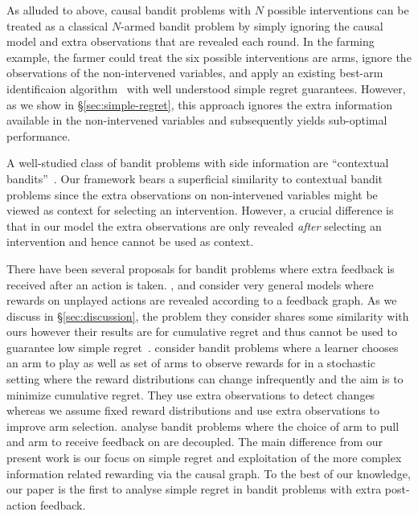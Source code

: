 As alluded to above, causal bandit problems with $N$ possible interventions can be treated as a classical $N$-armed bandit problem by simply ignoring the causal model and extra observations that are revealed each round.
In the farming example, the farmer could treat the six possible interventions are arms, ignore the observations of the non-intervened variables, and apply an existing best-arm identificaion algorithm~\citep{Jamieson2013} with well understood simple regret guarantees.
However, as we show in \S\ref{sec:simple-regret}, this approach ignores the extra information available in the non-intervened variables and subsequently yields sub-optimal performance.

A well-studied class of bandit problems with side information are ``contextual bandits''~\cite{Langford2008,Agarwal2014}.
Our framework bears a superficial similarity to contextual bandit problems since the extra observations on non-intervened variables might be viewed as context for selecting an intervention. 
However, a crucial difference is that in our model the extra observations are only revealed \emph{after} selecting an intervention and hence cannot be used as context.

There have been several proposals for bandit problems where extra feedback is received after an action is taken.
\citet{Alon2015}, \citet{Kocak2014} and \citet{wu2015online} consider very general models where rewards on unplayed actions are revealed according to a feedback graph.
As we discuss in \S\ref{sec:discussion}, the problem they consider shares some similarity with ours however their results are for cumulative regret and thus cannot be used to guarantee low simple regret~\citep{Bubeck2009}.
\citet{Yu2009} consider bandit problems where a learner chooses an arm to play as well as set of arms to observe rewards for in a stochastic setting where the reward distributions can change infrequently and the aim is to minimize cumulative regret.
They use extra observations to detect changes whereas we assume fixed reward distributions and use extra observations to improve arm selection.
\citet{Avner2012} analyse bandit problems where the choice of arm to pull and arm to receive feedback on are decoupled. 
The main difference from our present work is our focus on simple regret and exploitation of the more complex information related rewarding via the causal graph.
To the best of our knowledge, our paper is the first to analyse simple regret in bandit problems with extra post-action feedback.


